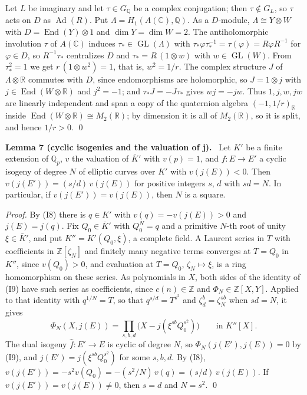 \documentclass[11pt]{article}
\newenvironment{statement}[1]{\par\medskip\noindent\phantomsection\textbf{#1}\ }{\par\medskip}
\newcommand{\Q}{\mathbb Q}
\newcommand{\Z}{\mathbb Z}
\DeclareMathOperator{\End}{End}
\DeclareMathOperator{\GL}{GL}
\DeclareMathOperator{\Ad}{Ad}
\begin{document}
Let \(L\) be imaginary and let \(\tau\in G_{\Q}\) be a complex conjugation; then \(\tau\notin G_L\), so \(\tau\)
acts on \(D\) as \(\Ad(R)\). Put \(\Lambda=H_1(A(\mathbb C),\Q)\). As a \(D\)-module, \(\Lambda\cong Y\otimes W\)
with \(D=\End(Y)\otimes1\) and \(\dim Y=\dim W=2\). The antiholomorphic involution \(\tau\) of \(A(\mathbb C)\)
induces \(\tau_*\in\GL(\Lambda)\) with \(\tau_*\varphi\tau_*^{-1}=\tau(\varphi)=R\varphi R^{-1}\) for
\(\varphi\in D\), so \(R^{-1}\tau_*\) centralizes \(D\) and \(\tau_*=R\,(1\otimes w)\) with \(w\in\GL(W)\). From
\(\tau_*^2=1\) we get \(r\,(1\otimes w^2)=1\), that is, \(w^2=1/r\). The complex structure \(J\) of
\(\Lambda\otimes\mathbb R\) commutes with \(D\), since endomorphisms are holomorphic, so \(J=1\otimes j\) with
\(j\in\End(W\otimes\mathbb R)\) and \(j^2=-1\); and \(\tau_*J=-J\tau_*\) gives \(wj=-jw\). Thus \(1,j,w,jw\) are
linearly independent and span a copy of the quaternion algebra \((-1,1/r)_{\mathbb R}\) inside
\(\End(W\otimes\mathbb R)\cong M_2(\mathbb R)\); by dimension it is all of \(M_2(\mathbb R)\), so it is split, and
hence \(1/r>0\). \qed

\begin{statement}{Lemma 7 (cyclic isogenies and the valuation of j).}\label{lemma-tate}
Let \(K'\) be a finite extension of \(\Q_p\), \(v\) the valuation of \(\bar K'\) with \(v(p)=1\), and \(f\colon E\to
E'\) a cyclic isogeny of degree \(N\) of elliptic curves over \(K'\) with \(v(j(E))<0\). Then
\(v(j(E'))=(s/d)\,v(j(E))\) for positive integers \(s\), \(d\) with \(sd=N\). In particular, if
\(v(j(E'))=v(j(E))\), then \(N\) is a square.
\end{statement}

\emph{Proof.} By (I8) there is \(q\in K'\) with \(v(q)=-v(j(E))>0\) and \(j(E)=j(q)\). Fix \(Q_0\in\bar K'\) with
\(Q_0^N=q\) and a primitive \(N\)-th root of unity \(\xi\in\bar K'\), and put \(K''=K'(Q_0,\xi)\), a complete field.
A Laurent series in \(T\) with coefficients in \(\Z[\zeta_N]\) and finitely many negative terms converges at
\(T=Q_0\) in \(K''\), since \(v(Q_0)>0\), and evaluation at \(T=Q_0\), \(\zeta_N\mapsto\xi\), is a ring homomorphism
on these series. As polynomials in \(X\), both sides of the identity of (I9) have such series as coefficients,
since \(c(n)\in\Z\) and \(\Phi_N\in\Z[X,Y]\). Applied to that identity with \(q^{1/N}=T\), so that
\(q^{s/d}=T^{s^2}\) and \(\zeta_d^b=\zeta_N^{sb}\) when \(sd=N\), it gives
\[\Phi_N(X,j(E))=\prod_{s,b,d}\bigl(X-j(\xi^{sb}Q_0^{s^2})\bigr)\qquad\text{in }K''[X].\]
The dual isogeny \(\hat f\colon E'\to E\) is cyclic of degree \(N\), so \(\Phi_N(j(E'),j(E))=0\) by (I9), and
\(j(E')=j(\xi^{sb}Q_0^{s^2})\) for some \(s,b,d\). By (I8),
\(v(j(E'))=-s^2v(Q_0)=-(s^2/N)\,v(q)=(s/d)\,v(j(E))\). If \(v(j(E'))=v(j(E))\neq0\), then \(s=d\) and \(N=s^2\). \qed
\end{document}
